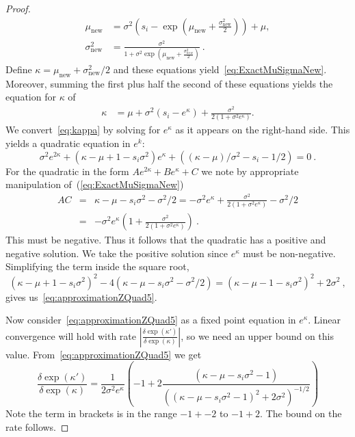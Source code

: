 \begin{proof}
%
\begin{align}
    \mu_{\text{new}} & = \sigma^{2}\left(s_i - \exp\left(\mu_{\text{new}}+\frac{\sigma_{\text{new}}^2}{2}\right)\right) + \mu, \nonumber \\
   \sigma_{\text{new}}^2 & = \frac{\sigma^2}{1+\sigma^2 \exp(\mu_{\text{new}}+\frac{\sigma_{new}^2}{2})}~.\nonumber
\end{align}
Define $\kappa=\mu_{\text{new}}+\sigma_{\text{new}}^2/2$ and these
equations yield~\eqref{eq:ExactMuSigmaNew}.  Moreover,
summing the first plus half the second of these equations
yields the equation for $\kappa$ of
\begin{align}\label{eq:kappa}
    \kappa & = \mu + \sigma^2(s_i - e^\kappa) + \frac{\sigma^2}{2(1+\sigma^2e^\kappa)}.
\end{align}
We convert~\eqref{eq:kappa} by solving for $e^\kappa$
as it appears on the right-hand side.  This yields
a quadratic equation in $e^k$:
\[
\sigma^2e^{2\kappa}
+ (\kappa-\mu+1-s_i\sigma^2)e^\kappa
+ \left((\kappa-\mu)/\sigma^2-s_i-1/2\right)=0~.
\]
For the quadratic in the form
$Ae^{2\kappa}+Be^\kappa+C$ we note 
by appropriate manipulation of~(\ref{eq:ExactMuSigmaNew})
\begin{eqnarray*}
AC&=&\kappa-\mu-s_i\sigma^2-\sigma^2/2=
-\sigma^2e^\kappa +\frac{\sigma^2}{2\left(1+\sigma^2e^\kappa\right)}-\sigma^2/2
\\
&=& -\sigma^2e^\kappa \left(1+\frac{\sigma^2}{2\left(1+\sigma^2e^\kappa\right)}\right)
~.
\end{eqnarray*}
This must be negative.
Thus it follows that the quadratic has a positive and negative solution.
We take the positive solution since $e^\kappa$ must be non-negative.
Simplifying the term inside the square root,
\[
(\kappa-\mu+1-s_i\sigma^2)^2-4\left(\kappa-\mu-s_i\sigma^2-\sigma^2/2\right)
= (\kappa-\mu-1-s_i\sigma^2)^2+2\sigma^2~,
\]
gives us~\eqref{eq:approximationZQuad5}.

Now consider~\eqref{eq:approximationZQuad5} as a fixed point equation
in $e^\kappa$.  Linear convergence will hold with rate
$\left|\frac{\delta \exp(\kappa')}{\delta \exp(\kappa)}\right|$,
so we need an upper bound on this value.
From~\eqref{eq:approximationZQuad5} we get
\[
\frac{\delta \exp(\kappa')}{\delta \exp(\kappa)}=
\frac{1}{2\sigma^2 e^\kappa}
\left(-1 + 
2\frac{(\kappa - \mu - s_i\sigma^2 -1)}{
 \left((\kappa - \mu - s_i\sigma^2 -1)^2+2\sigma^2\right)^{-1/2}}\right)
\]
Note the term in brackets is in the range $-1+-2$ to $-1+2$.
The bound on the rate follows.
\end{proof}

